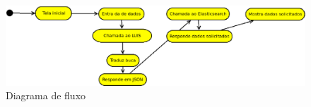 \begin{figure}[!htb]
        \caption{\label{Fluxo aplicação}Diagrama de fluxo}
        \begin{center}
                \includegraphics[width=\textwidth]{imagens/teste.eps}
        \end{center}
\end{figure}

